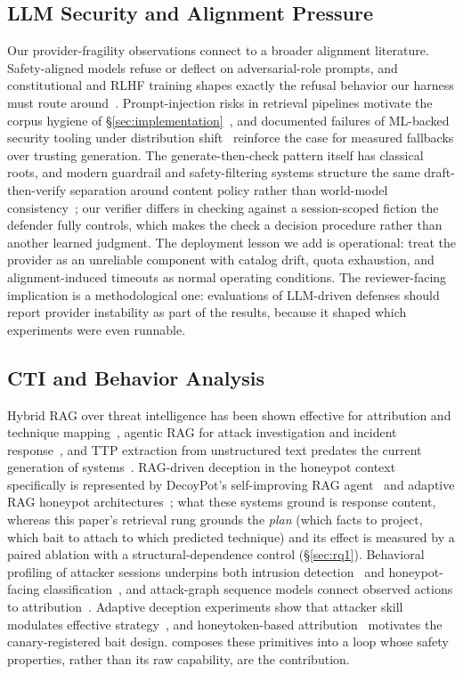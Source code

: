 \subsection{LLM Security and Alignment Pressure}
Our provider-fragility observations connect to a broader alignment literature.
Safety-aligned models refuse or deflect on adversarial-role prompts, and
constitutional and RLHF training shapes exactly the refusal behavior our
harness must route around~\cite{bai2022,ganguli2022,christiano2017}.
Prompt-injection risks in retrieval pipelines motivate the corpus hygiene
of \S\ref{sec:implementation}~\cite{greshake2023,perez2022}, and
documented failures of ML-backed security tooling under distribution
shift~\cite{reworr2024} reinforce the case for measured fallbacks over
trusting generation. The generate-then-check pattern itself has
classical roots, and modern guardrail and safety-filtering systems
structure the same draft-then-verify separation around content policy
rather than world-model consistency~\cite{inan2023}; our verifier
differs in checking against a session-scoped fiction the defender fully
controls, which makes the check a decision procedure rather than
another learned judgment. The deployment lesson we add is operational:
treat the provider as an unreliable component with catalog drift, quota
exhaustion, and alignment-induced timeouts as normal operating conditions.
The reviewer-facing implication is a methodological one: evaluations of
LLM-driven defenses should report provider instability as part of the
results, because it shaped which experiments were even runnable.

\subsection{CTI and Behavior Analysis}
Hybrid RAG over threat intelligence has been shown effective for
attribution and technique mapping~\cite{alsada2024,rajapaksha2024},
agentic RAG for attack investigation and incident
response~\cite{blefari2025,liu2025}, and TTP extraction from unstructured
text predates the current generation of systems~\cite{orbinato2022}.
RAG-driven deception in the honeypot context specifically is represented
by DecoyPot's self-improving RAG agent~\cite{sezgin2025decoypot} and
adaptive RAG honeypot architectures~\cite{qiao2025}; what these systems
ground is response content, whereas this paper's retrieval rung grounds
the \emph{plan} (which facts to project, which bait to attach to which
predicted technique) and its effect is measured by a paired ablation with
a structural-dependence control (\S\ref{sec:rq1}).
Behavioral profiling of attacker sessions underpins both intrusion
detection~\cite{bachl2021,farasat2024b,sharafaldin2018} and
honeypot-facing classification~\cite{lekssays2025}, and attack-graph
sequence models connect observed actions to
attribution~\cite{alsaheel2021,noureddine2020}. Adaptive
deception experiments show that attacker skill modulates effective
strategy~\cite{kouremetis2024,jeon2024}, and honeytoken-based
attribution~\cite{spitzner2003,valeros2024} motivates the
canary-registered bait
design. \system composes these primitives into a loop whose safety
properties, rather than its raw capability, are the contribution.
